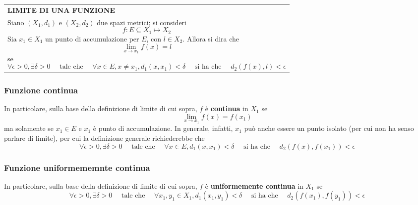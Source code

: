 \documentclass[a4paper]{extarticle}
\renewcommand\arraystretch{}
\begin{document}
\vspace{1em}
\setlength{\tabcolsep}{14pt}
\renewcommand{\arraystretch}{2}
\noindent
\begin{tabularx}{\textwidth}{@{}|P|@{}}
    \hline
    {\textbf{LIMITE DI UNA FUNZIONE}}\\
    \parbox{\linewidth}{Siano $(X_1,d_1)$ e $(X_2,d_2)$ due spazi metrici; si consideri
    \[f : E \subseteq X_1 \longmapsto X_2\]
    Sia $x_1 \in X_1$ un punto di accumulazione per $E$, con $l \in X_2$. Allora si dira che
    \[\lim_{x \to x_1} f(x) = l\]
    se
    \[\forall \epsilon>0, \exists \delta>0 \hspace{1em} \text{ tale che } \hspace{1em} \forall x \in E, x \neq x_1, d_1(x,x_1) < \delta \hspace{1em} \text{ si ha che } \hspace{1em} d_2(f(x),l) < \epsilon\]
    \vspace{-1mm}}\\
    \hline
\end{tabularx}

\vspace{1em}
\noindent
\subsubsection{Funzione continua}
In particolare, sulla base della definizione di limite di cui sopra, $f$ è \textbf{continua} in $X_1$ se
\[\lim_{x \to x_1} f(x) = f(x_1)\]
ma solamente se $x_1 \in E$ e $x_1$ è punto di accumulazione. In generale, infatti, $x_1$ può anche essere un punto isolato (per cui non ha senso parlare di limite), per cui la definizione generale richiederebbe che
\[\forall \epsilon>0, \exists \delta>0 \hspace{1em} \text{ tale che } \hspace{1em} \forall x \in E, d_1(x,x_1) < \delta \hspace{1em} \text{ si ha che } \hspace{1em} d_2(f(x),f(x_1)) < \epsilon\]

\vspace{1em}
\noindent
\subsubsection{Funzione uniformememnte continua}
In particolare, sulla base della definizione di limite di cui sopra, $f$ è \textbf{uniformemente continua} in $X_1$ se
\[\forall \epsilon>0, \exists \delta>0 \hspace{1em} \text{ tale che } \hspace{1em} \forall x_1,y_1 \in X_1, d_1(x_1,y_1) < \delta \hspace{1em} \text{ si ha che } \hspace{1em} d_2(f(x_1),f(y_1)) < \epsilon\]
\end{document}
